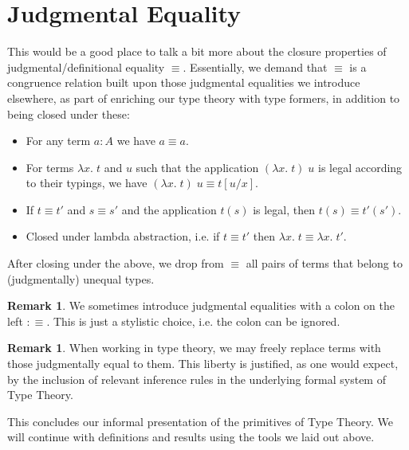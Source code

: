 \documentclass[12pt]{report}
\theoremstyle{definition}
\newtheorem{rem}[thm]{Remark}
\begin{document}
\section{Judgmental Equality}
This would be a good place to talk a bit more about the closure properties of judgmental/definitional equality $\equiv$. 
	Essentially, we demand that $\equiv$ is a congruence relation built upon those judgmental equalities we introduce elsewhere, as part of enriching our type theory with type formers, in addition to being closed under these:
	\begin{itemize}
	\item For any term $a : A$ we have $a \equiv a$. 
	\item For terms $\lambda x.\;t$ and $u$ such that the application $(\lambda x.\;t)\;u$ is legal according to their typings, we have $(\lambda x.\;t)\;u \equiv t[u/x]$. 
	\item If $t \equiv t'$ and $s \equiv s'$ and the application $t(s)$ is legal, then $t(s) \equiv t'(s')$. 
	\item Closed under lambda abstraction, i.e. if $t \equiv t'$ then $\lambda x.\;t \equiv \lambda x.\;t'$. 
	\end{itemize}
	After closing under the above, we drop from $\equiv$ all pairs of terms that belong to (judgmentally) unequal types. 
	\begin{rem}
	We sometimes introduce judgmental equalities with a colon on the left $:\equiv$. 
	This is just a stylistic choice, i.e. the colon can be ignored. 
	\end{rem}
	\begin{rem}
	When working in type theory, we may freely replace terms with those judgmentally equal to them. 
	This liberty is justified, as one would expect, by the inclusion of relevant inference rules in the underlying formal system of Type Theory. 
	\end{rem}
	This concludes our informal presentation of the primitives of Type Theory. 
	We will continue with definitions and results using the tools we laid out above. 
\end{document}
